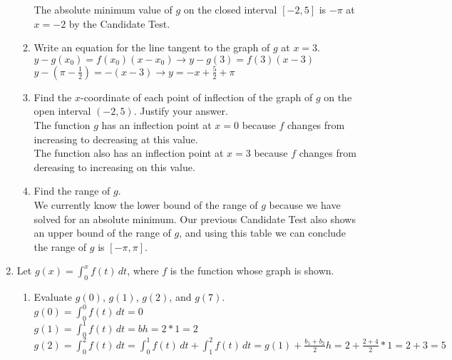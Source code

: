 \documentclass[10pt, letterpaper]{report}
\begin{document}
\begin{enumerate}
\begin{enumerate}
      The absolute minimum value of $g$ on the closed interval $[-2,5]$ is $-\pi$ at $x=-2$ by the Candidate Test.\\

    \item{Write an equation for the line tangent to the graph of $g$ at $x=3$.} \\

      $y - g(x_{0}) = f(x_{0})(x - x_{0}) \rightarrow y - g(3) = f(3)(x - 3) $ \\

      $y - (\pi - \frac{1}{2}) = -(x - 3) \rightarrow y = -x + \frac{5}{2} + \pi$ \\

    \item{Find the $x$-coordinate of each point of inflection of the graph of $g$ on the open interval $(-2,5)$. Justify your answer.} \\

      The function $g$ has an inflection point at $x=0$ because $f$ changes from increasing to decreasing at this value. \\

      The function also has an inflection point at $x=3$ because $f$ changes from dereasing to increasing on this value. \\

    \item{Find the range of $g$.} \\

      We currently know the lower bound of the range of $g$ because we have solved for an absolute minimum. Our previous Candidate Test also shows an upper bound of the range of $g$, and using this table we can conclude the range of $g$ is $[-\pi, \pi]$.
  \pagebreak
  \end{enumerate}
  \item{Let $g(x)=\int_{0}^{x}{f(t)}\,dt$, where $f$ is the function whose graph is shown.}
  \begin{enumerate}
    \item{Evaluate $g(0)$, $g(1)$, $g(2)$, and $g(7)$.} \\

      $g(0) = \int_{0}^{0}{f(t)}\,dt = 0$ \\

      $g(1) = \int_{0}^{1}{f(t)}\,dt = bh = 2*1 = 2$ \\

      $g(2) = \int_{0}^{2}{f(t)}\,dt =
      \int_{0}^{1}{f(t)}\,dt + \int_{1}^{2}{f(t)}\,dt =
      g(1) + \frac{b_{1} + b_{2}}{2}h = 2 + \frac{2 + 4}{2}*1 = 2 + 3 = 5$ \\


\end{enumerate}
\end{enumerate}
\end{document}
